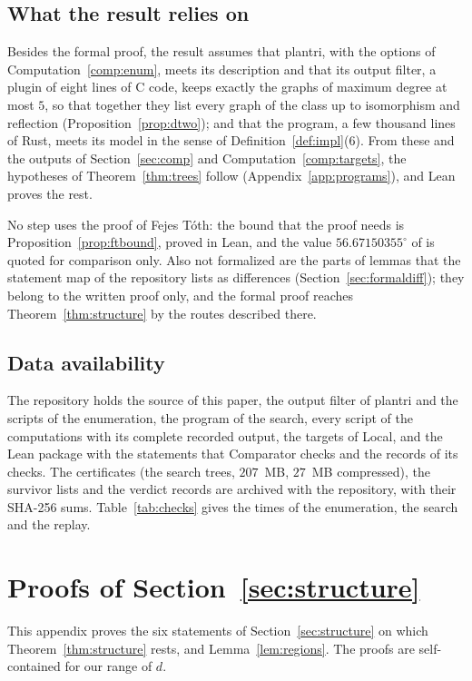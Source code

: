 \documentclass[12pt]{amsart}
\theoremstyle{definition}
\theoremstyle{plain}
\theoremstyle{definition}
\begin{document}
\subsection{What the result relies on}\label{sec:notlean}
Besides the formal proof, the result assumes that plantri, with the options of Computation~\ref{comp:enum}, meets its description \cite{BM} and that its output filter, a plugin of eight lines of C code, keeps exactly the graphs of maximum degree at most $5$, so that together they list every graph of the class up to isomorphism and reflection (Proposition~\ref{prop:dtwo}); and that the program, a few thousand lines of Rust, meets its model in the sense of Definition~\ref{def:impl}(6). From these and the outputs of Section~\ref{sec:comp} and Computation~\ref{comp:targets}, the hypotheses of Theorem~\ref{thm:trees} follow (Appendix~\ref{app:programs}), and Lean proves the rest.

No step uses the proof of Fejes T\'oth: the bound that the proof needs is Proposition~\ref{prop:ftbound}, proved in Lean, and the value $56.67150355^\circ$ of \cite{FT43} is quoted for comparison only. Also not formalized are the parts of lemmas that the statement map of the repository lists as differences (Section~\ref{sec:formaldiff}); they belong to the written proof only, and the formal proof reaches Theorem~\ref{thm:structure} by the routes described there.

\subsection{Data availability}
The repository \cite{Rep} holds the source of this paper, the output filter of plantri and the scripts of the enumeration, the program of the search, every script of the computations with its complete recorded output, the targets of Local, and the Lean package with the statements that Comparator checks and the records of its checks. The certificates (the search trees, $207$~MB, $27$~MB compressed), the survivor lists and the verdict records are archived with the repository, with their SHA-256 sums. Table~\ref{tab:checks} gives the times of the enumeration, the search and the replay.

\appendix

\section{Proofs of Section~\ref{sec:structure}}\label{app:structure}

This appendix proves the six statements of Section~\ref{sec:structure} on which Theorem~\ref{thm:structure} rests, and Lemma~\ref{lem:regions}. The proofs are self-contained for our range of $d$.
\end{document}
